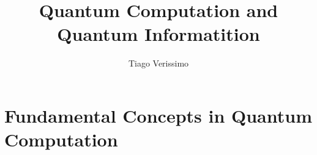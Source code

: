 \documentclass[hidelinks]{article}
\title{\textbf{Quantum Computation and Quantum Informatition}}
\author{Tiago Verissimo}
\begin{document}
\hypersetup{bookmarksnumbered=true,}
\pagecolor{black}
\color{white}
\maketitle

\begin{Large}
\tableofcontents
\end{Large}
\pagebreak

\section{Fundamental Concepts in Quantum Computation}
\end{document}
